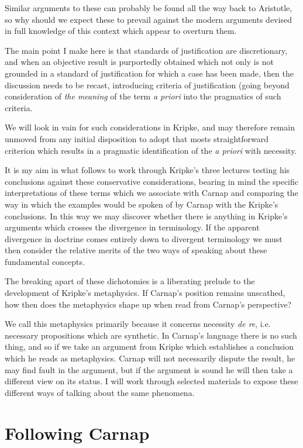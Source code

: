 Similar arguments to these can probably be found all the way back to Aristotle,
so why should we expect these to prevail against the modern arguments devised in
full knowledge of this context which appear to overturn them.

The main point I make here is that standards of justification are discretionary,
and when an objective result is purportedly obtained which not only is not grounded
in a standard of justification for which a case has been made, then the discussion
needs to be recast, introducing criteria of justification (going beyond consideration
of \emph{the meaning} of the term \emph{a priori} into the pragmatics of such criteria.

We will look in vain for such considerations in Kripke, and may therefore remain
unmoved from any initial disposition to adopt that mosts straightforward criterion
which results in a pragmatic identification of the \emph{a priori} with necessity.

It is my aim in what follows to work through Kripke's three lectures testing his
conclusions against these conservative considerations, bearing in mind the specific
interpretations of these terms which we associate with Carnap and comparing the
way in which the examples would be spoken of by Carnap with the Kripke's conclusions.
In this way we may discover whether there is anything in Kripke's arguments which
crosses the divergence in terminology.
If the apparent divergence in doctrine comes entirely down to divergent terminology
we must then consider the relative merits of the two ways of speaking about these
fundamental concepts.

The breaking apart of these dichotomies is a liberating prelude to the development
of Kripke's metaphysics.
If Carnap's position remains unscathed, how then does the metaphysics shape up
when read from Carnap's perspective?

We call this metaphysics primarily because it concerns necessity \emph{de re},
i.e. necessary propositions which are synthetic.
In Carnap's language there is no such thing, and so if we take an
argument from Kripke which establishes a conclusion which he reads as metaphysics.
Carnap will not necessarily dispute the result, he may find fault in the argument,
but if the argument is sound he will then take a different view on its status.
I will work through selected materials to expose these different ways of talking
about the same phenomena.

\chapter{Following Carnap}

